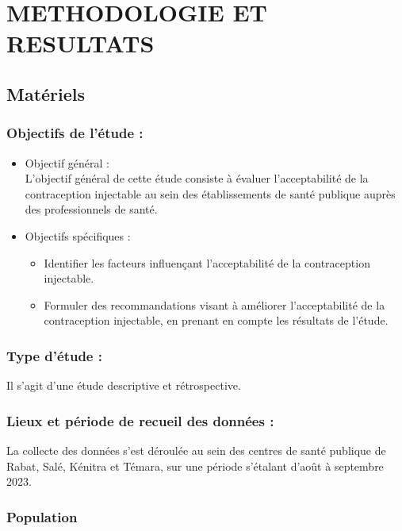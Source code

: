 \section{METHODOLOGIE ET RESULTATS }
\subsection{Matériels}
\subsubsection{Objectifs de l’étude : }

\begin{itemize}
  \item Objectif général : \\
  L’objectif général de cette étude consiste à évaluer l’acceptabilité de la contraception injectable au sein des établissements de santé publique auprès des professionnels de santé.  
  \item Objectifs spécifiques :  
  \begin{itemize}[label={$\circ$}, nosep]
    \item Identifier les facteurs influençant l’acceptabilité de la contraception injectable. 
    \item Formuler des recommandations visant à améliorer l’acceptabilité de la contraception injectable, en prenant en compte les résultats de l’étude.  
    \end{itemize}
\end{itemize}

\subsubsection{Type d’étude : }

Il s’agit d’une étude descriptive et rétrospective. 

\subsubsection{Lieux et période de recueil des données : }

La collecte des données s'est déroulée au sein des centres de santé publique de Rabat, Salé, Kénitra et Témara, sur une période s'étalant d'août à septembre 2023.

\subsubsection{Population}

